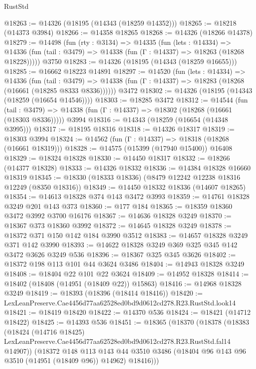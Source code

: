 \begin{lexlean}{RustStd}
\begin{coremodule}
@18263 := @14326 (@18195 (@14343 (@18259 @14352)))
@18265 := @18218 (@14373 @3984)
@18266 := @14358 @18265
@18268 := @14326 (@18266 @14378)
@18279 := @14498
    (fun (rty : @3134) =>
    @14335
      (fun (lets : @14334) =>
      @14336 (fun (tail : @3479) => @14338 (fun (Γ : @14337) => @18263 (@18268 @18228)))))
    @3750
@18283 := @14326 (@18195 (@14343 (@18259 @16655)))
@18285 := @16662 @18223 @14891
@18297 := @14520
    (fun (lets : @14334) =>
    @14336
      (fun (tail : @3479) =>
      @14338 (fun (Γ : @14337) => @18283 (@18268 (@16661 (@18285 @8333 @8336))))))
    @3472
@18302 := @14326 (@18195 (@14343 (@18259 (@16654 @14546))))
@18303 := @18285 @3472
@18312 := @14544
    (fun (tail : @3479) => @14338 (fun (Γ : @14337) => @18302 (@18268 (@16661 (@18303 @8336)))))
    @3994
@18316 := @14343 (@18259 (@16654 (@14348 @3995)))
@18317 := @18195 @18316
@18318 := @14326 @18317
@18319 := @18303 @3994
@18324 := @14562 (fun (Γ : @14337) => @18318 (@18268 (@16661 @18319)))
@18328 := @14575 (@15399 (@17940 @15400)) @16408
@18329 := @18324 @18328
@18330 := @14450 @18317
@18332 := @18266 (@14377 @18328)
@18333 := @14326 @18332
@18336 := @14384 @18328 @16660 @18319
@18345 := @18330 (@18333 @18336) (@8479 @12242 @12238 @18316 @12249 (@8350 @18316))
@18349 := @14450 @18332 @18336 (@14607 @18265)
@18354 := @14613 @18328 @374 @143 @3472 @3993
@18359 := @14761 @18328 @3249 @201 @143 @373
@18360 := @177 @184
@18365 := @18359 @18360 @3472 @3992 @3700 @16176
@18367 := @14636 @18328 @3249
@18370 := @18367 @373 @18360 @3992
@18372 := @14645 @18328 @3249
@18378 := @18372 @371 @150 @142 @184 @3990 @3512
@18383 := @14657 @18328 @3249 @371 @142 @3990
@18393 := @14622 @18328 @3249 @369 @325 @345 @142 @3472 @3626 @3249 @536
@18396 := @18367 @325 @345 @3626
@18402 := @18372 @198 @113 @101 @44 @3624 @3486
@18404 := @14943 @18328 @3249
@18408 := @18404 @22 @101 @22 @3624
@18409 := @14952 @18328
@18414 := @18402 (@18408 (@14951 (@18409 @22)) @15863)
@18416 := @14968 @18328 @3249
@18419 := @18393 (@18396 (@18414 @18416))
@18420 := LexLeanPreserve.Cae4456d77aa62528ed0bd9d0612cd278.R23.RustStd.look14
@18421 := @18419 @18420
@18422 := @14370 @536
@18424 := @18421 (@14712 @18422)
@18425 := @14393 @536
@18451 := @18365
    (@18370
      (@18378
        (@18383
          (@18424
            (@14716 @18425)
            LexLeanPreserve.Cae4456d77aa62528ed0bd9d0612cd278.R23.RustStd.fal14
            @14907))
        (@18372
          @148
          @113
          @143
          @44
          @3510
          @3486
          (@18404 @96 @143 @96 @3510 (@14951 (@18409 @96)) @14962)
          @18416)))

\end{coremodule}
\end{lexlean}
